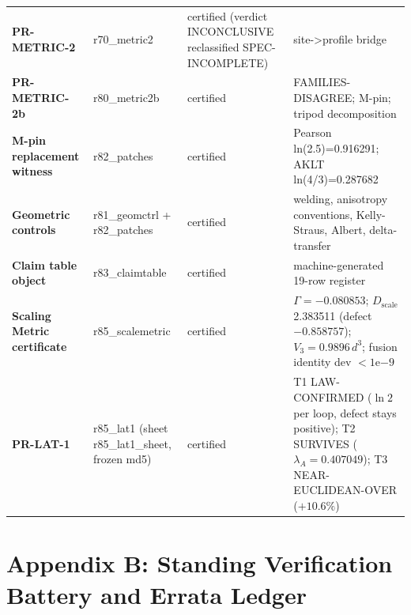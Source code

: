 \documentclass[11pt,a4paper]{article}
\theoremstyle{definition}
\begin{document}
\begin{tabularx}{\linewidth}{l l l X}
\textbf{PR-METRIC-2} & r70\_metric2 & certified (verdict INCONCLUSIVE reclassified SPEC-INCOMPLETE) & site->profile bridge \\
\textbf{PR-METRIC-2b} & r80\_metric2b & certified & FAMILIES-DISAGREE; M-pin; tripod decomposition \\
\textbf{M-pin replacement witness} & r82\_patches & certified & Pearson ln(2.5)=0.916291; AKLT ln(4/3)=0.287682 \\
\textbf{Geometric controls} & r81\_geomctrl + r82\_patches & certified & welding, anisotropy conventions, Kelly-Straus, Albert, delta-transfer \\
\textbf{Claim table object} & r83\_claimtable & certified & machine-generated 19-row register \\
\textbf{Scaling Metric certificate} & r85\_scalemetric & certified & $\Gamma = -0.080853$; $D_{\mathrm{scale}}$ 2.383511 (defect $-0.858757$); $V_3 = 0.9896\,d^3$; fusion identity dev $<1\mathrm{e}{-9}$ \\
\textbf{PR-LAT-1} & r85\_lat1 (sheet r85\_lat1\_sheet, frozen md5) & certified & T1 LAW-CONFIRMED ($\ln 2$ per loop, defect stays positive); T2 SURVIVES ($\lambda_A = 0.407049$); T3 NEAR-EUCLIDEAN-OVER ($+10.6\%$) \\
\bottomrule
\end{tabularx}
\normalsize


\section*{Appendix B: Standing Verification Battery and Errata Ledger}
\end{document}
